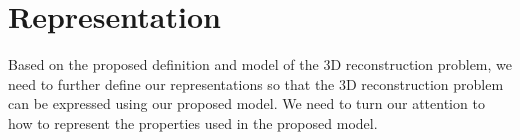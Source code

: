 \section{Representation}
\label{sec:3DRecon_Rep}
Based on the proposed definition and model of the 3D reconstruction problem, we need to further define our representations so that the 3D reconstruction problem can be expressed using our proposed model. We need to turn our attention to how to represent the properties used in the proposed model.







